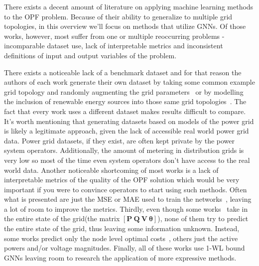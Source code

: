 There exists a decent amount of literature on applying machine learning methods to the OPF problem.
Because of their ability to generalize to multiple grid topologies, in this overview we'll focus on
methods that utilize GNNs. Of those works, however, most suffer from one or multiple reoccurring problems -
incomparable dataset use, lack of interpretable metrics and inconsistent definitions of input and output
variables of the problem.

There exists a noticeable lack of a benchmark dataset and for that reason the authors
of each work generate their own dataset by taking some common example grid topology
and randomly augmenting the grid
parameters~\cite{liu2022topology, liu2021graph, yang2022ac, owerko2020optimal, owerko2022unsupervised}
or by modelling the inclusion of renewable energy sources into those same grid
topologies~\cite{surani2023graph, gao2023physics}.
The fact that every work uses a different dataset makes results difficult to compare.
It's worth mentioning that generating datasets based on models of the power grid is likely a legitimate approach, given the lack of accessible real world power grid data.
Power grid datasets, if they exist, are often kept private by the power system operators.
Additionally, the amount of metering in distribution grids is very low so most of the time even
system operators don't have access to the real world data.
Another noticeable shortcoming of most works is a lack of interpretable metrics of
the quality of the OPF solution which would be very important if you were to convince operators
to start using such methods.
Often what is presented are just the MSE or MAE used to train
the networks~\cite{gao2023physics, liu2022topology, liu2021graph}, leaving a lot of room to improve the metrics.
Thirdly, even though some works~\cite{owerko2020optimal, owerko2022unsupervised} take
in the entire state of the grid(the matrix $[\boldsymbol{P} \ \boldsymbol{Q} \ \boldsymbol{V} \ \boldsymbol{\theta}]$),
none of them try to predict the entire state of the grid, thus leaving some information unknown.
Instead, some works predict only the node level optimal costs~\cite{surani2023graph, liu2021graph},
others just the active powers and/or voltage magnitudes.
Finally, all of these works use 1-WL bound GNNs leaving room to research the application of more expressive methods.
